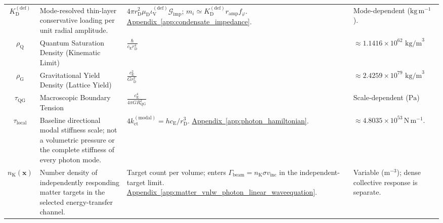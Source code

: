 \begin{longtable}{@{} c p{5.5cm} p{4cm} p{3.5cm} @{}}
$K_{\mathrm D}^{(\mathrm{def})}$ & {\raggedright Mode-resolved thin-layer conservative loading per unit radial amplitude.\par} & {\raggedright $4\pi r_{\mathrm D}^2\mu_{\mathrm D}\iota_{\mathrm V}^{(\mathrm{def})}\mathcal G_{\mathrm{imp}}$; $m_i\simeq K_{\mathrm D}^{(\mathrm{def})}r_{\mathrm{amp}}f_\varphi$. \newline \hyperref[app:condensate_impedance]{Appendix~\ref*{app:condensate_impedance}}.\par} & {\raggedright Mode-dependent ($\mathrm{kg\,m^{-1}}$).\par} \\


$\rho_{\mathrm{Q}}$ & Quantum Saturation Density (Kinematic Limit) & $\frac{\hbar}{c_{\mathrm{E}} r_{\mathrm{D}}^4}$ & $\approx 1.1416 \times 10^{62} \text{ kg/m}^3$ \\

$\rho_{\mathrm{G}}$ & Gravitational Yield Density (Lattice Yield) & $\frac{c_{\mathrm{E}}^2}{G r_{\mathrm{D}}^2}$ & $\approx 2.4259 \times 10^{79} \text{ kg/m}^3$ \\

$\tau_{\mathrm{QG}}$ & Macroscopic Boundary Tension & $\frac{c_{\mathrm{E}}^4}{4\pi G R_{\mathrm{QG}}^2}$ & Scale-dependent ($\text{Pa}$) \\

$\tau_{\mathrm{local}}$ & {\raggedright Baseline directional modal stiffness scale; not a volumetric pressure or the complete stiffness of every photon mode.\par} & {\raggedright $4k_{\mathrm{ct}}^{(\mathrm{modal})}=hc_{\mathrm E}/r_{\mathrm D}^3$. \newline \hyperref[app:photon_hamiltonian]{Appendix~\ref*{app:photon_hamiltonian}}.\par} & {\raggedright $\approx4.8035\times10^{53}\,\mathrm{N\,m^{-1}}$.\par} \\



$n_{\mathrm K}(\mathbf x)$ & {\raggedright Number density of independently responding matter targets in the selected energy-transfer channel.\par} & {\raggedright Target count per volume; enters $\Gamma_{\mathrm{beam}}=n_{\mathrm K}\sigma v_{\mathrm{inc}}$ in the independent-target limit. \newline \hyperref[app:matter_vnlw_photon_linear_waveequation]{Appendix~\ref*{app:matter_vnlw_photon_linear_waveequation}}.\par} & {\raggedright Variable ($\mathrm{m^{-3}}$); dense collective response is separate.\par} \\


\end{longtable}
